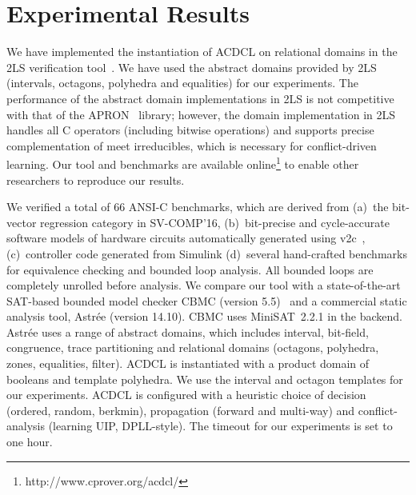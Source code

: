 

\section{Experimental Results}

We have implemented the instantiation of ACDCL on relational domains in the
2LS verification tool~\cite{2ls}.  We have used the abstract domains
provided by 2LS (intervals, octagons, polyhedra and equalities) for our
experiments.  The performance of the abstract domain implementations in 2LS
is not competitive with that of the APRON~\cite{apron} library; however, the
domain implementation in 2LS handles all C operators (including bitwise
operations) and supports precise complementation of meet irreducibles, which
is necessary for conflict-driven learning.  Our tool and benchmarks are
available online\footnote{http://www.cprover.org/acdcl/} to enable other
researchers to reproduce our results.

We verified a total of 66 ANSI-C benchmarks, which are derived from (a)~the
bit-vector regression category in SV-COMP'16, (b)~bit-precise and
cycle-accurate software models of hardware circuits automatically generated
using v2c~\cite{mtk2016}, (c)~controller code generated from Simulink
(d)~several hand-crafted benchmarks for equivalence checking and bounded
loop analysis.  All bounded loops are completely unrolled before analysis. 
We compare our tool with a state-of-the-art SAT-based bounded model checker
CBMC (version 5.5)~\cite{cbmc} and a commercial static analysis tool, 
Astr{\'e}e (version 14.10). 
CBMC uses MiniSAT~2.2.1 in the backend.  Astr{\'e}e uses a 
range of abstract domains, which includes interval, 
bit-field, congruence, trace partitioning and relational domains
(octagons, polyhedra, zones, equalities, filter).  ACDCL is instantiated
with a product domain of booleans and template polyhedra.  We use the
interval and octagon templates for our experiments.  ACDCL is configured
with a heuristic choice of decision (ordered, random, berkmin), propagation
(forward and multi-way) and conflict-analysis (learning UIP, DPLL-style). 
The timeout for our experiments is set to one hour.
%

